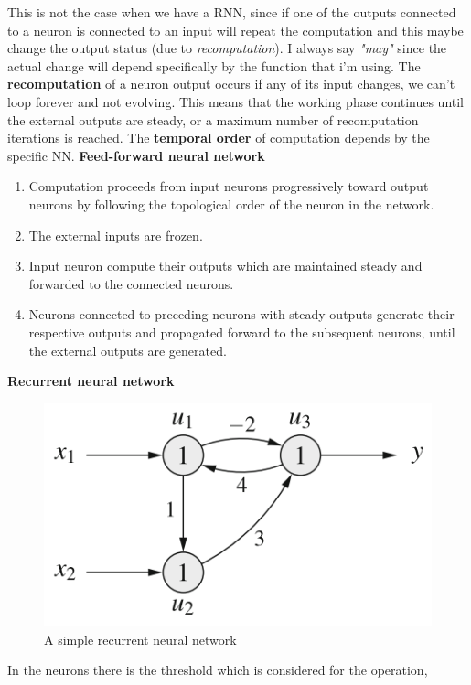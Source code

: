 \documentclass{article}
\begin{document}
This is not the case when we have a RNN, since if one of the outputs connected to
a neuron is connected to an input will repeat the computation and this maybe change
the output status (due to \textit{recomputation}). I always say \textit{"may"}
since the actual change will depend specifically by the function that i'm using.
The \textbf{recomputation} of a neuron output occurs if any of its input changes,
we can't loop forever and not evolving. This means that the working phase continues
until the external outputs are steady, or a maximum number of
recomputation iterations is reached. The \textbf{temporal order} of computation
depends by the specific NN.
\newline
\newline
\noindent\textbf{Feed-forward neural network}
\begin{enumerate}
    \item Computation proceeds from input neurons progressively toward output neurons by following
          the topological order of the neuron in the network.
    \item The external inputs are frozen.
    \item Input neuron compute their outputs which are maintained steady and forwarded
          to the connected neurons.
    \item Neurons connected to preceding neurons with steady outputs generate their
          respective outputs and propagated forward to the subsequent neurons, until the
          external outputs are generated.
\end{enumerate}
\noindent\textbf{Recurrent neural network}
\begin{figure}[H]
    \centering
    \includegraphics[scale=0.5]{images/RNN.png}
    \caption{A simple recurrent neural network}
\end{figure}
In the neurons there is the threshold which is considered for the operation,
\end{document}
